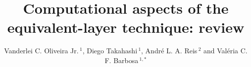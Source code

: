 \documentclass[utf8]{FrontiersinHarvard} %
\def\firstAuthorLast{Oliveira Jr. {et~al.}} %
\def\Authors{Vanderlei C. Oliveira Jr.\,$^{1}$, Diego Takahashi\,$^{1}$, Andr{\'e} L. A. Reis\,$^{2}$ and Val{\'e}ria C. F. Barbosa\,$^{1,*}$}
\begin{document}
	\onecolumn
	
	\title {Computational aspects of the equivalent-layer technique: review} 
	
	\author[\firstAuthorLast ]{\Authors} %
	\address{} %
	\correspondance{} %
	
	\extraAuth{}%
	
	\maketitle
	
\end{document}
